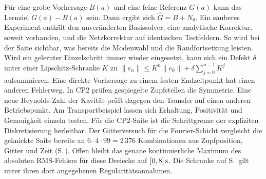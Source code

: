 \hypertarget{punkt9-3-1}{}
Für eine grobe Vorhersage \(B(a)\) und eine feine Referenz \(G(a)\) kann das Lernziel \(G(a)-B(a)\) sein. Dann ergibt sich \(\hat G=B+N_\theta\). Ein sauberes Experiment enthält den unveränderten Basissolver, eine analytische Korrektur, soweit vorhanden, und die Netzkorrektur auf identischen Testfeldern. So wird bei der Saite sichtbar, was bereits die Modenwahl und die Randfortsetzung leisten.
\hypertarget{punkt9-3-2}{}
Wird ein gelernter Einzelschritt immer wieder eingesetzt, kann sich ein Defekt \(\delta\) unter einer Lipschitz-Schranke \(K\) zu \(\|e_n\|\le K^n\|e_0\|+\delta\sum_{j=0}^{n-1}K^j\) aufsummieren. Eine direkte Vorhersage zu einem festen Endzeitpunkt hat einen anderen Fehlerweg. In CP2 prüfen gespiegelte Zupfstellen die Symmetrie. Eine neue Reynolds-Zahl der Kavität prüft dagegen den Transfer auf einen anderen Betriebspunkt.
Am Transportbeispiel lassen sich Erhaltung, Positivität und Genauigkeit einzeln testen. Für die CP2-Saite ist die Schrittgrenze der expliziten Diskretisierung herleitbar. Der Gitterversuch für die Fourier-Schicht vergleicht die geknickte Saite bereits an \(6\cdot4\cdot99=2\,376\) Kombinationen aus Zupfposition, Gitter und Zeit (S.\,). Offen bleibt das genaue kontinuierliche Maximum des absoluten RMS-Fehlers für diese Dreiecke auf \([0,8]\,\mathrm{s}\). Die Schranke auf S.\, gilt unter ihren dort angegebenen Regularitätsannahmen.

